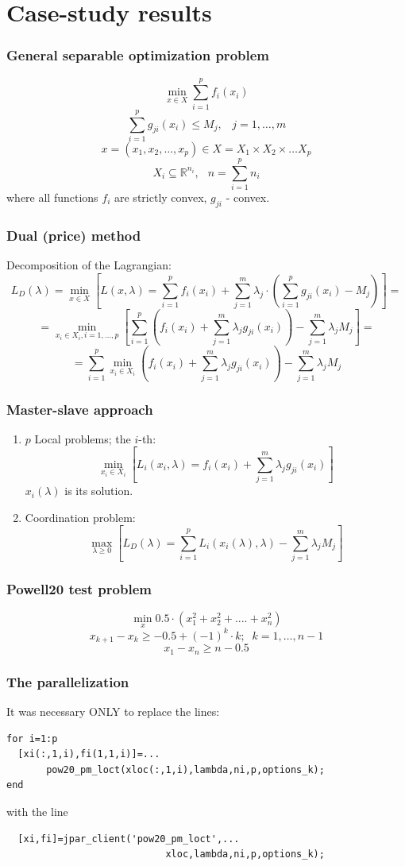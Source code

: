 \documentclass{beamer}
\def\Rset{\mathbb{R}}
\newcommand{\beq}{\begin{equation}}
\newcommand{\eeq}{\end{equation}}
\begin{document}
\section{Case-study results}

\begin{frame}
\frametitle{General separable optimization problem}
\beq
\min_{x \in X} \sum_{i=1}^p f_i(x_i)
\label{zad.sep.wj}
\eeq
\beq
\sum_{i=1}^p g_{ji}(x_i) \leq M_j, \;\;\;  j=1,\ldots,m
\eeq
\beq
x =(x_1,x_2,\ldots,x_p) \in
X=X_1 \times X_2 \times \ldots X_p
\eeq
\beq X_i \subseteq \Rset^{n_i},\;\;\, n=\sum_{i=1}^p n_i
\label{zad.sep.kon}
\eeq
where all  functions $f_i$ are strictly convex, $g_{ji}$ - convex.
\end{frame}

\begin{frame}
\frametitle{Dual (price) method}
Decomposition of the Lagrangian:
\[
L_D(\lambda) = \min_{x \in X} \left[ L(x,\lambda) =
\sum_{i=1}^p f_i(x_i) + \sum_{j=1}^m \lambda_j \cdot \left( \sum_{i=1}^p g_{ji}(x_i) -
M_j \right) \right]
 =
\]
\[
= \min_{x_i \in
X_i , i=1,\ldots,p} \left[ \sum_{i=1}^p \left(f_i(x_i) +
\sum_{j=1}^m \lambda_j  g_{ji}(x_i) \right) - \sum_{j=1}^m \lambda_j
M_j \right] =
\]
\beq
=\sum_{i=1}^p \min_{x_i \in X_i} \left( f_i(x_i) +
\sum_{j=1}^m \lambda_j  g_{ji}(x_i) \right) - \sum_{j=1}^m \lambda_j
M_j
\label{f.dualna}
\eeq
\end{frame}

\begin{frame}
\frametitle{Master-slave approach}
\begin{enumerate}
\item $p$ Local problems; the $i$-th:
\beq
\min_{x_i \in X_i} \left[ L_i(x_i,\lambda)=f_i(x_i) + \sum_{j=1}^m \lambda_j  g_{ji}(x_i)\right]
\eeq
\hspace{1cm}$x_i(\lambda)$  is its solution.
\item Coordination problem:
\beq
\max_{\lambda \geq 0} \left[ L_D(\lambda)= \sum_{i=1}^p L_i(x_i(\lambda),\lambda)
           - \sum_{j=1}^m   \lambda_j M_j \right]
\eeq
\end{enumerate}
\end{frame}

\begin{frame}
\frametitle{Powell20 test problem}
\beq
    \min_{x} 0.5 \cdot ( x_1^2+x_2^2+....+x_n^2 )
\eeq
\beq
                 x_{k+1}-x_{k} \geq -0.5+(-1)^k\cdot k; \;\; k=1,\ldots,n-1
\eeq
\beq
                  x_1-x_n \geq n-0.5
\eeq
\end{frame}
\begin{frame}[fragile]
\frametitle{The parallelization}
It was necessary ONLY to replace the lines:
\begin{verbatim}
for i=1:p
  [xi(:,1,i),fi(1,1,i)]=...
       pow20_pm_loct(xloc(:,1,i),lambda,ni,p,options_k);
end
\end{verbatim}
with the line
\begin{verbatim}
  [xi,fi]=jpar_client('pow20_pm_loct',...
                            xloc,lambda,ni,p,options_k);
\end{verbatim}
\end{frame}
\end{document}

